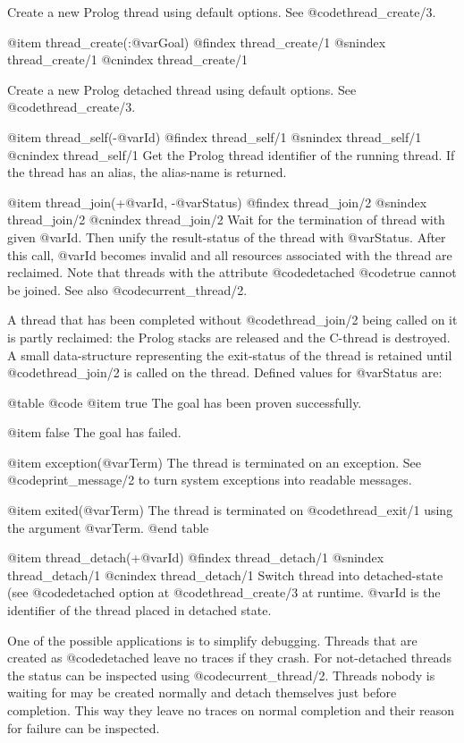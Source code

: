 {{{{{{{{Create a new Prolog thread using default options. See @code{thread_create/3}.

@item thread_create(:@var{Goal})
@findex thread_create/1
@snindex thread_create/1
@cnindex thread_create/1

Create a new Prolog detached thread using default options. See @code{thread_create/3}.

@item thread_self(-@var{Id})
@findex thread_self/1
@snindex thread_self/1
@cnindex thread_self/1
Get the Prolog thread identifier of the running thread.  If the thread
has an alias, the alias-name is returned.

@item thread_join(+@var{Id}, -@var{Status})
@findex thread_join/2
@snindex thread_join/2
@cnindex thread_join/2
Wait for the termination of thread with given @var{Id}.  Then unify the
result-status of the thread with @var{Status}.  After this call,
@var{Id} becomes invalid and all resources associated with the thread
are reclaimed.  Note that threads with the attribute @code{detached}
@code{true} cannot be joined.  See also @code{current_thread/2}.

A thread that has been completed without @code{thread_join/2} being
called on it is partly reclaimed: the Prolog stacks are released and the
C-thread is destroyed. A small data-structure representing the
exit-status of the thread is retained until @code{thread_join/2} is called on
the thread.  Defined values for @var{Status} are:

@table @code
    @item true
The goal has been proven successfully.

    @item false
The goal has failed.

    @item exception(@var{Term})
 The thread is terminated on an
exception.  See @code{print_message/2} to turn system exceptions into
readable messages.

    @item exited(@var{Term})
The thread is terminated on @code{thread_exit/1} using the argument @var{Term}.
@end table


@item thread_detach(+@var{Id})
@findex thread_detach/1
@snindex thread_detach/1
@cnindex thread_detach/1
Switch thread into detached-state (see @code{detached} option at
@code{thread_create/3} at runtime.  @var{Id} is the identifier of the thread
placed in detached state.

One of the possible applications is to simplify debugging. Threads that
are created as @code{detached} leave no traces if they crash. For
not-detached threads the status can be inspected using
@code{current_thread/2}.  Threads nobody is waiting for may be created
normally and detach themselves just before completion.  This way they
leave no traces on normal completion and their reason for failure can be
inspected.

}}}}}}}}
